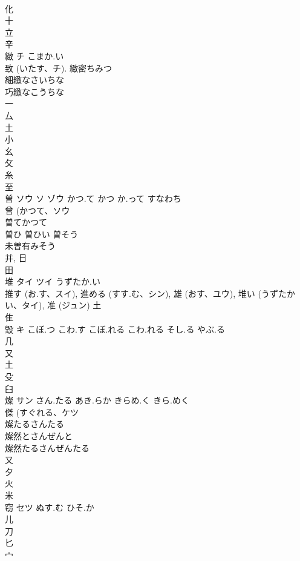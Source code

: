 \documentclass[8pt]{extreport}
\begin{document}
\begin{CJK}{UTF8}{min}
\\	化 
\\	十 
\\	立 
\\	辛 
\\	緻	チ	こまか.い	
\\	致 (いたす、チ).		緻密ちみつ 
\\	細緻なさいちな 
\\	巧緻なこうちな 
\\	一 
\\	厶 
\\	土 
\\	小 
\\	幺 
\\	攵 
\\	糸 
\\	至 
\\	曽	ソウ ソ ゾウ	かつ.て かつ か.って すなわち	
\\	曾 (かつて、ソウ 
\\	曽てかつて 
\\	曽ひ 曽ひい 曽そう 
\\	未曽有みそう 
\\	并, 日 
\\	田 
\\	堆	タイ ツイ	うずたか.い	
\\	推す (お.す、スイ), 進める (すす.む、シン), 雄 (おす、ユウ), 堆い (うずたかい、タイ), 准 (ジュン)			土 
\\	隹 
\\	毀	キ	こぼ.つ こわ.す こぼ.れる こわ.れる そし.る やぶ.る	
\\	几 
\\	又 
\\	土 
\\	殳 
\\	臼 
\\	燦	サン	さん.たる あき.らか きらめ.く きら.めく	
\\	傑 (すぐれる、ケツ 
\\	燦たるさんたる 
\\	燦然とさんぜんと 
\\	燦然たるさんぜんたる 
\\	又 
\\	夕 
\\	火 
\\	米 
\\	窃	セツ	ぬす.む ひそ.か	
\\	儿 
\\	刀 
\\	匕 
\\	宀 

\end{CJK}
\end{document}
